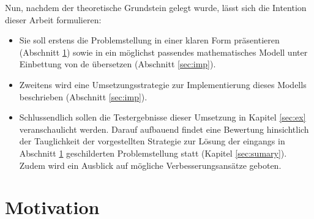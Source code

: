 		Nun, nachdem der theoretische Grundstein gelegt wurde, lässt sich die Intention dieser Arbeit formulieren:
		\begin{itemize}
			\item Sie soll erstens die Problemstellung in einer klaren Form präsentieren (Abschnitt \ref{sec:motivation}) sowie in ein möglichst passendes mathematisches Modell unter Einbettung von \gls{de} übersetzen (Abschnitt \ref{sec:imp}).
			\item Zweitens wird eine Umsetzungsstrategie zur Implementierung dieses Modells beschrieben (Abschnitt \ref{sec:imp}).
			\item Schlussendlich sollen die Testergebnisse dieser Umsetzung in Kapitel \ref{sec:ex} veranschaulicht werden. Darauf aufbauend findet eine Bewertung hinsichtlich der Tauglichkeit der vorgestellten Strategie zur Lösung der eingangs in Abschnitt \ref{sec:motivation} geschilderten Problemstellung statt (Kapitel \ref{sec:sumary}). Zudem wird ein Ausblick auf mögliche Verbesserungsansätze geboten. 
		\end{itemize}
	
	\section{Motivation}
	\label{sec:motivation}
